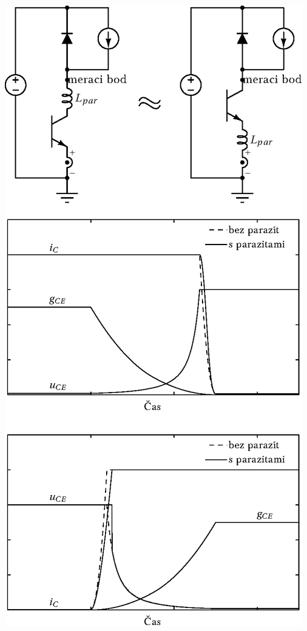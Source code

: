 \documentclass[oneside]{article}
\begin{document}
{\hspace{36pt}
\includegraphics[height=.85\textheight]{obr/Lpar_bez_prekmitu}
\par }
\end{document}
